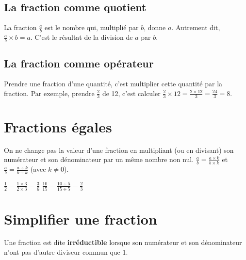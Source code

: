 \subsection{La fraction comme quotient}
\begin{proprietebox}
  La fraction $\frac{a}{b}$ est le nombre qui, multiplié par $b$, donne $a$. Autrement dit, $\frac{a}{b} \times b = a$.
  C'est le résultat de la division de $a$ par $b$.
\end{proprietebox}

\subsection{La fraction comme opérateur}
\begin{definitionbox}[Opérateur]
  Prendre une fraction d'une quantité, c'est multiplier cette quantité par la fraction. Par exemple, prendre $\frac{2}{3}$ de 12, c'est calculer $\frac{2}{3} \times 12 = \frac{2 \times 12}{3} = \frac{24}{3} = 8$.
\end{definitionbox}

\section{Fractions égales}

\begin{proprietebox}
  On ne change pas la valeur d'une fraction en multipliant (ou en divisant) son numérateur et son dénominateur par un même nombre non nul.
  $\frac{a}{b} = \frac{a \times k}{b \times k}$ et $\frac{a}{b} = \frac{a \div k}{b \div k}$ (avec $k \neq 0$).
\end{proprietebox}

\begin{examplebox}
  $\frac{1}{2} = \frac{1 \times 3}{2 \times 3} = \frac{3}{6}$
  $\frac{10}{15} = \frac{10 \div 5}{15 \div 5} = \frac{2}{3}$
\end{examplebox}

\section{Simplifier une fraction}

\begin{definitionbox}
  Une fraction est dite \textbf{irréductible} lorsque son numérateur et son dénominateur n'ont pas d'autre diviseur commun que 1.
\end{definitionbox}

